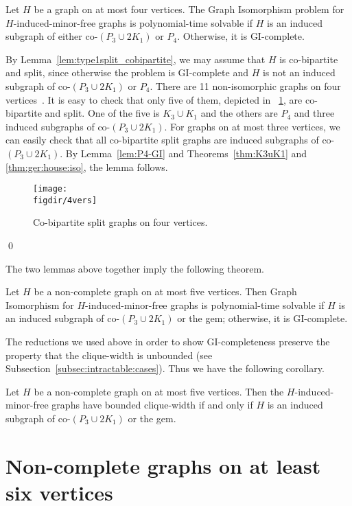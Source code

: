 \documentclass[envcountsame,envcountsect,11pt,a4paper]{llncs}
\renewenvironment{proof}{\begin{Proof}}{\qed\end{Proof}}
\newcommand{\figref}[1]{\figurename~\ref{#1}}
\newcommand{\figdir}{.}
\begin{document}
\begin{lemma}
Let $H$ be a graph on at most four vertices.
The {\sc Graph Isomorphism} problem for $H$-induced-minor-free graphs is polynomial-time solvable
if $H$ is an induced subgraph of either co-$(P_{3} \cup 2 K_{1})$ 
or $P_{4}$. Otherwise, it is GI-complete.
\end{lemma}
\begin{proof}
By Lemma~\ref{lem:type1split_cobipartite}, we may assume that $H$ is co-bipartite and split,
since otherwise the problem is GI-complete and
$H$ is not an induced subgraph of co-$(P_{3} \cup 2 K_{1})$ or $P_{4}$.
There are 11 non-isomorphic graphs on four vertices~\cite{ISGCI-small_graphs}.
It is easy to check that only five of them, depicted in \figref{fig:4vers}, are co-bipartite and split.
One of the five is $K_{3} \cup K_{1}$ and the others are $P_{4}$ and three induced subgraphs of co-$(P_{3} \cup 2 K_{1})$.
For graphs on at most three vertices,
we can easily check that all co-bipartite split graphs are
induced subgraphs of co-$(P_{3} \cup 2 K_{1})$.
By Lemma~\ref{lem:P4-GI} and Theorems~\ref{thm:K3uK1} and \ref{thm:ger:house:iso},
the lemma follows.
\begin{figure}[htb]
  \centering
  \texttt{[image: \\figdir/4vers]}
  \caption{Co-bipartite split graphs on four vertices.}
  \label{fig:4vers}
\end{figure}
\end{proof}


The two lemmas above together imply the following theorem.
\begin{theorem}
Let $H$ be a non-complete graph on at most five vertices.
Then {\sc Graph Isomorphism} for $H$-induced-minor-free graphs
is polynomial-time solvable if $H$ is an induced subgraph of
co-$(P_{3} \cup 2 K_{1})$ or the gem;
otherwise, it is GI-complete.
\end{theorem}

The reductions we used above in order to show GI-completeness preserve
the property that the clique-width is unbounded (see Subsection~\ref{subsec:intractable:cases}). Thus we have the following corollary.
\begin{corollary}
Let $H$ be a non-complete graph on at most five vertices.
Then the $H$-induced-minor-free graphs have bounded clique-width
if and only if $H$ is an induced subgraph of co-$(P_{3} \cup 2 K_{1})$ or the gem.
\end{corollary}




\section{Non-complete graphs on at least six vertices}\label{sec:at:least:6:vert}
\end{document}
